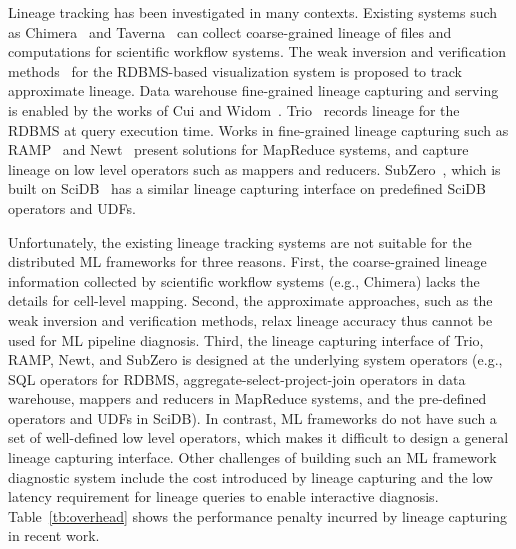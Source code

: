 \documentclass{sig-alternate}
\begin{document}
Lineage tracking has been investigated in many contexts.
Existing systems such as Chimera~\cite{foster02} and Taverna~\cite{oinn02} can collect coarse-grained lineage 
of files and computations for scientific workflow systems.
The weak inversion and verification methods~\cite{woodruff97} for the RDBMS-based visualization system 
is proposed to track approximate lineage.
Data warehouse fine-grained lineage capturing and serving is enabled by the works of Cui and Widom~\cite{cui00, cui03}.
Trio~\cite{widom04} records lineage for the RDBMS at query execution time.
Works in fine-grained lineage capturing such as RAMP~\cite{ikeda11, park11} and Newt~\cite{logothetis13} present
solutions for MapReduce systems, and capture lineage on low level operators such as mappers and reducers.
SubZero~\cite{wu13}, which is built on SciDB~\cite{brown10} has a similar lineage capturing interface on predefined SciDB operators and UDFs.

Unfortunately, the existing lineage tracking systems are not suitable for the distributed ML frameworks for three reasons.
First, the coarse-grained lineage information collected by scientific workflow systems (e.g., Chimera) lacks the details for cell-level mapping.
Second, the approximate approaches, such as the weak inversion and verification methods, 
relax lineage accuracy thus cannot be used for ML pipeline diagnosis.
Third, the lineage capturing interface of Trio, RAMP, Newt, and SubZero is designed at
the underlying system operators (e.g., SQL operators for RDBMS, aggregate-select-project-join operators in data warehouse, 
mappers and reducers in MapReduce systems, and the pre-defined operators and UDFs in SciDB). 
In contrast, ML frameworks do not have such a set of well-defined low level operators,
which makes it difficult to design a general lineage capturing interface.
Other challenges of building such an ML framework diagnostic system include the cost introduced by 
lineage capturing and the low latency requirement for lineage queries to enable interactive diagnosis.
Table~\ref{tb:overhead} shows the performance penalty incurred by lineage capturing in recent work.
\end{document}
